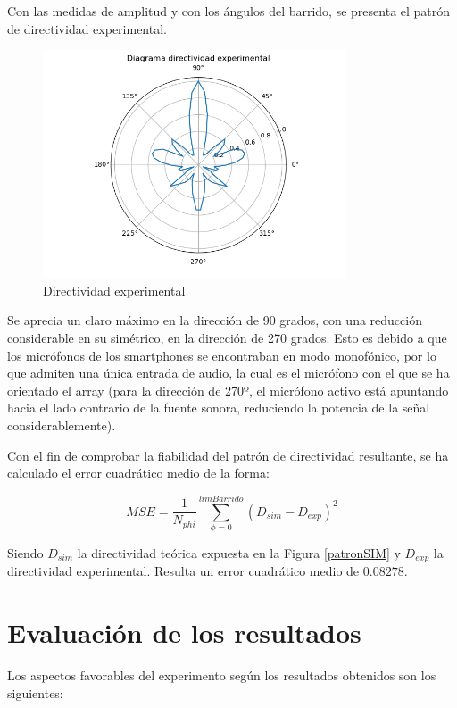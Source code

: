 \documentclass[a4paper,11pt]{book}
\begin{document}
Con las medidas de amplitud y con los ángulos del barrido, se presenta el patrón de directividad experimental.

\begin{figure}[hbtp]
\centering
\includegraphics[width = 9cm]{FIGURAS/directividad_experimental.png}
\caption{Directividad experimental}
\end{figure}


Se aprecia un claro máximo en la dirección de 90 grados, con una reducción considerable en su simétrico, en la dirección de 270 grados. Esto es debido a que los micrófonos de los smartphones se encontraban en modo monofónico, por lo que admiten una única entrada de audio, la cual es el micrófono con el que se ha orientado el array (para la dirección de 270º, el micrófono activo está apuntando hacia el lado contrario de la fuente sonora, reduciendo la potencia de la señal considerablemente).

Con el fin de comprobar la fiabilidad del patrón de directividad resultante, se ha calculado el error cuadrático medio de la forma:

\begin{equation}
MSE = \frac{1}{N_{phi}}\sum_{\phi = 0}^{limBarrido} (D_{sim} - D_{exp})^2
\end{equation}

Siendo $D_{sim}$ la directividad teórica expuesta en la Figura \ref{patronSIM} y $D_{exp}$ la directividad experimental. Resulta un error cuadrático medio de \textbf{$0.08278$}.


\section{Evaluación de los resultados}

Los aspectos favorables del experimento según los resultados obtenidos son los siguientes:
\end{document}
